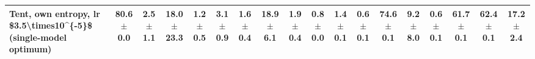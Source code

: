 \begin{table}[t]
{\begin{tabular}{l|c|ccc|cccc|cccc|cccc|c}
        \quad Tent, own entropy, lr \$3.5\textbackslash{}times10\textasciicircum{}\{-5\}\$ (single-model optimum) & 80.6 {\scriptsize$\pm$0.0} & 2.5 {\scriptsize$\pm$1.1} & 18.0 {\scriptsize$\pm$23.3} & 1.2 {\scriptsize$\pm$0.5} & 3.1 {\scriptsize$\pm$0.9} & 1.6 {\scriptsize$\pm$0.4} & 18.9 {\scriptsize$\pm$6.1} & 1.9 {\scriptsize$\pm$0.4} & 0.8 {\scriptsize$\pm$0.0} & 1.4 {\scriptsize$\pm$0.1} & 0.6 {\scriptsize$\pm$0.1} & 74.6 {\scriptsize$\pm$0.1} & 9.2 {\scriptsize$\pm$8.0} & 0.6 {\scriptsize$\pm$0.1} & 61.7 {\scriptsize$\pm$0.1} & 62.4 {\scriptsize$\pm$0.1} & 17.2 {\scriptsize$\pm$2.4} \\
        \bottomrule
    \end{tabular}%
    }
\end{table}

